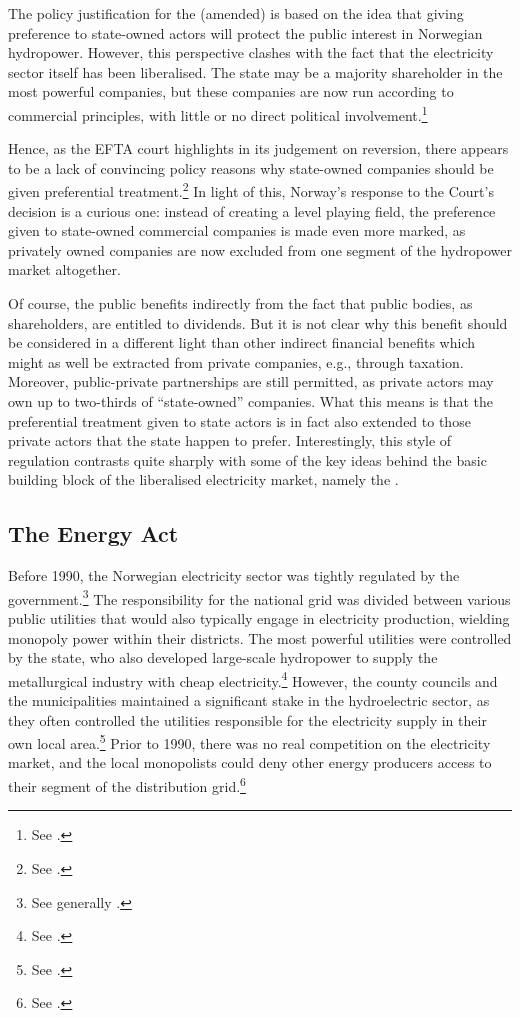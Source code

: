 The policy justification for the (amended) \cite{ica17} is based on the idea that giving preference to state-owned actors will protect the public interest in Norwegian hydropower. However, this perspective clashes with the fact that the electricity sector itself has been liberalised. The state may be a majority shareholder in the most powerful companies, but these companies are now run according to 
commercial principles, with little or no direct political involvement.\footnote{See \cite[86]{efta07}.}

Hence, as the EFTA court highlights in its judgement on reversion, there appears to be a lack of convincing policy reasons why state-owned companies should be given preferential treatment.\footnote{See \cite[84-87]{efta07}.} In light of this, Norway's response to the Court's decision is a curious one: instead of creating a level playing field, the preference given to state-owned commercial companies is made even more marked, as privately owned companies are now excluded from one segment of the hydropower market altogether.

Of course, the public benefits indirectly from the fact that public bodies, as shareholders, are entitled to dividends. But it is not clear why this benefit should be considered in a different light than other indirect financial benefits which might as well be extracted from private companies, e.g., through taxation. Moreover, public-private partnerships are still permitted, as private actors may own up to two-thirds of ``state-owned'' companies. What this means is that the preferential treatment given to state actors is in fact also extended to those private actors that the state happen to prefer. Interestingly, this style of regulation contrasts quite sharply with some of the key ideas behind the basic building block of the liberalised electricity market, namely the \cite{ea90}.

\subsection{The Energy Act}\label{sec:ea}

Before 1990, the Norwegian electricity sector was tightly regulated by the government.\footnote{See generally \cite{bye05,skjold07}.} The responsibility for the national grid was divided between various public utilities that would also typically engage in electricity production, wielding monopoly power within their districts. The most powerful utilities were controlled by the state, who also developed large-scale hydropower to supply the metallurgical industry with cheap electricity.\footnote{See \cite[67-71]{thue96}.} However, the county councils and the municipalities maintained a significant stake in the hydroelectric sector, as they often controlled the utilities responsible for the electricity supply in their own local area.\footnote{See \cite[85]{thue96}.} 
Prior to 1990, there was no real competition on the electricity market, and the local monopolists could deny other energy producers access to their segment of the distribution grid.\footnote{See \cite[83-84]{uleberg08}.}

